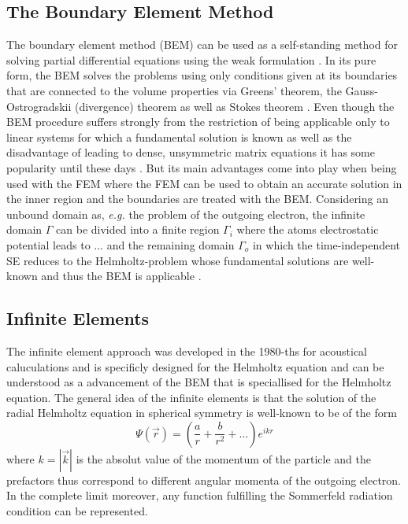\subsection{The Boundary Element Method}
The boundary element method (BEM) can be used as a self-standing method for solving partial differential equations using the weak formulation \cite{bemDai,bemCostabel}.
In its pure form, the BEM solves the problems using only conditions given at its boundaries that are connected to the volume properties via Greens' theorem, the Gauss-Ostrogradskii (divergence) theorem as well as Stokes theorem \cite{bemBook}.
Even though the BEM procedure suffers strongly from the restriction of being applicable only to linear systems for which a fundamental solution is known as well as the disadvantage of leading to dense, unsymmetric matrix equations \cite{bemCostabel} it has some popularity until these days \cite{bem1,bem2,bem3}.
But its main advantages come into play when being used with the FEM \cite{bem-fem} where the FEM can be used to obtain an accurate solution in the inner region and the boundaries are treated with the BEM.
Considering an unbound domain as, \textit{e.g.} the problem of the outgoing electron, the infinite domain $\Gamma$ can be divided into a finite region $\Gamma_i$ where the atoms electrostatic potential leads to ... and the remaining domain $\Gamma_o$ in which the time-independent SE reduces to the Helmholtz-problem whose fundamental solutions are well-known and thus the BEM is applicable \cite{bemCostabel, bettessBEM}.

\subsection{Infinite Elements}
The infinite element approach was developed in the 1980-ths for acoustical caluculations and is specificly designed for the Helmholtz equation and can be understood as a advancement of the BEM that is speciallised for the Helmholtz equation.
The general idea of the infinite elements is that the solution of the radial Helmholtz equation in spherical symmetry is well-known to be of the form
\begin{equation} \label{eq:infAnsatz}
 \Psi(\vec{r}) = \left(\frac ar +\frac{b}{r^2} + \hdots \right) e^{ikr}
\end{equation}
where $k=|\vec{k}|$ is the absolut value of the momentum of the particle and the prefactors thus correspond to different angular momenta of the outgoing electron.
In the complete limit moreover, any function fulfilling the Sommerfeld radiation condition \cite{sommerfeldCond} can be represented.

